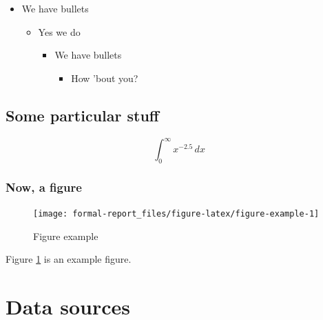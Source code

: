 \documentclass[
  11pt,
  american,
  letterpaper,
  ]{article}
\providecommand{\tightlist}{%
  \setlength{\itemsep}{0pt}\setlength{\parskip}{0pt}}
\begin{document}
\begin{itemize}
\tightlist
\item
  We have bullets

  \begin{itemize}
  \tightlist
  \item
    Yes we do

    \begin{itemize}
    \tightlist
    \item
      We have bullets

      \begin{itemize}
      \tightlist
      \item
        How 'bout you?
      \end{itemize}
    \end{itemize}
  \end{itemize}
\end{itemize}

\hypertarget{some-particular-stuff}{%
\subsection{Some particular stuff}\label{some-particular-stuff}}

\begin{equation}
\displaystyle\int_{0}^{\infty}x^{-2.5}\,dx
\end{equation}

\hypertarget{now-a-figure}{%
\subsubsection{Now, a figure}\label{now-a-figure}}

\begin{figure}
\texttt{[image: formal-report\_files/figure-latex/figure-example-1]} \caption{Figure example}\label{fig:figure-example}
\end{figure}

Figure \ref{fig:figure-example} is an example figure.

\FloatBarrier

\hypertarget{data-sources}{%
\section{Data sources}\label{data-sources}}
\end{document}
